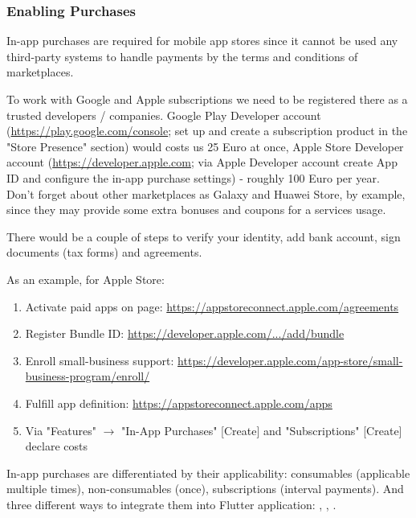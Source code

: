 \subsubsection{Enabling Purchases}

In-app purchases are required for mobile app stores since it cannot be used any third-party systems to handle payments
by the terms and conditions of marketplaces.

To work with Google and Apple subscriptions we need to be registered there as a trusted developers / companies. Google 
Play Developer account (\href{https://play.google.com/console}{https://play.google.com/console}; set up and create a 
subscription product in the "Store Presence" section) would costs us 25 Euro at once, Apple Store Developer 
account (\href{https://developer.apple.com}{https://developer.apple.com}; via Apple Developer account create App ID and 
configure the in-app purchase settings) - roughly 100 Euro per year. Don't forget about other marketplaces as 
Galaxy and Huawei Store, by example, since they may provide some extra bonuses and coupons for a services usage.

There would be a couple of steps to verify your identity, add bank account, sign documents (tax forms) and agreements.

As an example, for Apple Store:
\begin{enumerate}
  \item Activate paid apps on page: \href{https://appstoreconnect.apple.com/agreements}{https://appstoreconnect.apple.com/agreements}
  \item Register Bundle ID: 
  \href{https://developer.apple.com/account/resources/identifiers/bundleId/add/bundle}{https://developer.apple.com/.../add/bundle}
  \item Enroll small-business support: 
  \href{https://developer.apple.com/app-store/small-business-program/enroll/}{https://developer.apple.com/app-store/small-business-program/enroll/}
  \item Fulfill app definition: 
  \href{https://appstoreconnect.apple.com/apps}{https://appstoreconnect.apple.com/apps}
  \item Via "Features" $\rightarrow$ "In-App Purchases" [Create] and "Subscriptions" [Create] declare costs
\end{enumerate}

In-app purchases are differentiated by their applicability: consumables (applicable multiple times), non-consumables 
(once), subscriptions (interval payments). And three different ways to integrate them into Flutter application:
, , .
